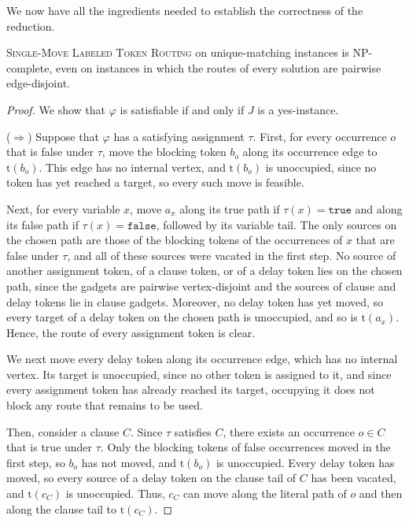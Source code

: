 \documentclass[a4paper,USenglish,thm-restate]{lipics-v2021}
\newcommand{\tgt}{\mathrm{t}}
\theoremstyle{problemstyle}
\begin{document}
We now have all the ingredients needed to establish the correctness of the reduction.

\begin{lemma}
\label{lem:unique_matching_hardness}
\textsc{Single-Move Labeled Token Routing} on unique-matching instances is
\textsf{NP}-complete, even on instances in which the routes of every solution
are pairwise edge-disjoint.
\end{lemma}

\begin{proof}
We show that $\varphi$ is satisfiable if and only if $J$ is a yes-instance.

\smallskip
\noindent
($\Rightarrow$) Suppose that $\varphi$ has a satisfying assignment $\tau$. First, for every
occurrence $o$ that is false under $\tau$, move the blocking token $b_o$
along its occurrence edge to $\tgt(b_o)$. This edge has no internal vertex,
and $\tgt(b_o)$ is unoccupied, since no token has yet reached a target, so
every such move is feasible.

Next, for every variable $x$, move $a_x$ along its true path if
$\tau(x)=\texttt{true}$ and along its false path if
$\tau(x)=\texttt{false}$, followed by its variable tail. The only sources on
the chosen path are those of the blocking tokens of the occurrences of $x$
that are false under $\tau$, and all of these sources were vacated in the
first step. No source of another assignment token, of a clause token, or of
a delay token lies on the chosen path, since the gadgets are pairwise
vertex-disjoint and the sources of clause and delay tokens lie in clause
gadgets. Moreover, no delay token has yet moved, so every target of a delay
token on the chosen path is unoccupied, and so is $\tgt(a_x)$. Hence, the
route of every assignment token is clear.

We next move every delay token along its occurrence edge, which has no
internal vertex. Its target is unoccupied, since no other token is assigned
to it, and since every assignment token has already reached its target,
occupying it does not block any route that remains to be used.

Then, consider a clause $C$. Since $\tau$ satisfies $C$, there exists an
occurrence $o\in C$ that is true under $\tau$. Only the blocking tokens of
false occurrences moved in the first step, so $b_o$ has not moved, and
$\tgt(b_o)$ is unoccupied. Every delay token has moved, so every source of a
delay token on the clause tail of $C$ has been vacated, and $\tgt(c_C)$ is
unoccupied. Thus, $c_C$ can move along the literal path of $o$ and then
along the clause tail to $\tgt(c_C)$.


\end{proof}
\end{document}
